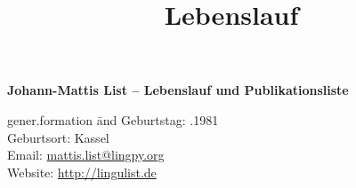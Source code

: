 \documentclass[xetex,11pt,a4paper]{moderncv}
\title{Lebenslauf}
\begin{document}
\pagestyle{plain}


\textbf{Johann-Mattis List -- Lebenslauf und Publikationsliste}\\ 
\noindent\begin{tabbing}
    gener.formation \= and \kill
    \footnotesize Geburtstag:                      .1981 \\
    \footnotesize Geburtsort:                      \> Kassel \\
    \footnotesize Email:                           \> \url{mattis.list@lingpy.org} \\
    \footnotesize Website:\> \url{http://lingulist.de}\\
\end{tabbing}
\end{document}
